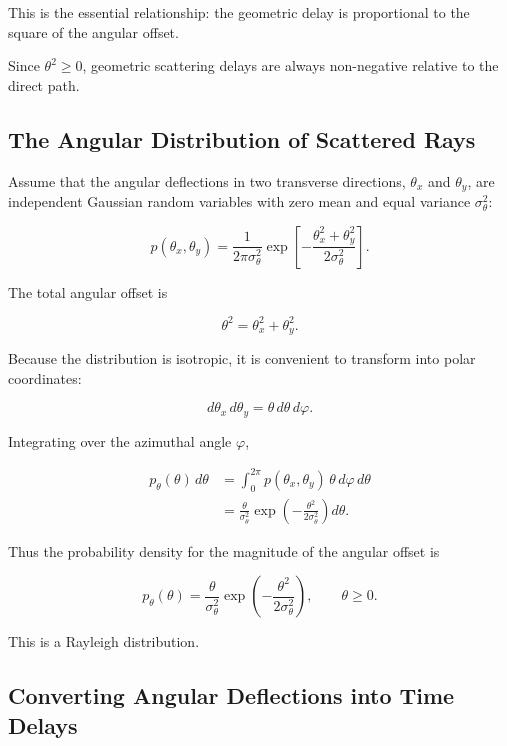 This is the essential relationship: the geometric
delay is proportional to the square of the angular
offset.

Since $\theta^2\geq 0$, geometric scattering delays
are always non-negative relative to the direct path.

\subsection{The Angular Distribution of Scattered Rays}

Assume that the angular deflections in two transverse
directions, $\theta_x$ and $\theta_y$, are independent
Gaussian random variables with zero mean and equal
variance $\sigma_\theta^2$:

\begin{equation}
p(\theta_x,\theta_y)
=
\frac{1}{2\pi\sigma_\theta^2}
\exp\left[
-\frac{\theta_x^2+\theta_y^2}
{2\sigma_\theta^2}
\right].
\end{equation}

The total angular offset is

\begin{equation}
\theta^2=\theta_x^2+\theta_y^2.
\end{equation}

Because the distribution is isotropic, it is convenient
to transform into polar coordinates:

\begin{equation}
d\theta_x\,d\theta_y
=
\theta\,d\theta\,d\varphi.
\end{equation}

Integrating over the azimuthal angle $\varphi$,

\begin{align}
p_\theta(\theta)\,d\theta
&=
\int_0^{2\pi}
p(\theta_x,\theta_y)\,
\theta\,d\varphi\,d\theta\\
&=
\frac{\theta}{\sigma_\theta^2}
\exp\left(
-\frac{\theta^2}{2\sigma_\theta^2}
\right)d\theta.
\end{align}

Thus the probability density for the magnitude
of the angular offset is

\begin{equation}
\boxed{
p_\theta(\theta)
=
\frac{\theta}{\sigma_\theta^2}
\exp\left(
-\frac{\theta^2}{2\sigma_\theta^2}
\right),
\qquad \theta\geq0.
}
\end{equation}

This is a Rayleigh distribution.

\subsection{Converting Angular Deflections into Time Delays}

